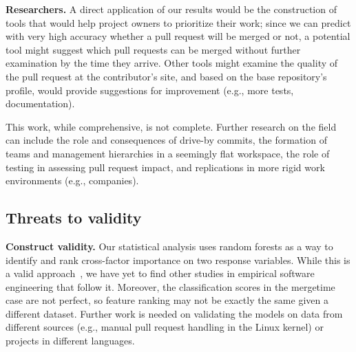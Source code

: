 \documentclass{acm_proc_article-sp}
\begin{document}

\textbf{Researchers.}
A direct application of our results would be the construction of tools that
would help project owners to prioritize their work; since we can predict
with very high accuracy whether a pull request will be merged or not, a
potential tool might suggest which pull requests can be merged without further
examination by the time they arrive. Other tools might examine the quality of
the pull request at the contributor's site, and based on the base repository's
profile, would provide suggestions for improvement (e.g., more tests,
documentation). 

This work, while comprehensive, is not complete. Further research
on the field can include the role and consequences of drive-by commits, 
the formation of teams and management hierarchies in a seemingly flat
workspace, the role of testing in assessing pull request impact,
and replications in more rigid work environments (e.g., companies).

\subsection{Threats to validity}

\textbf{Construct validity.} Our statistical analysis uses random forests as a way
to identify and rank cross-factor importance on two response variables. While
this is a valid approach~\cite{Genue10}, we have yet to find other studies in
empirical software engineering that follow it. Moreover, the classification
scores in the \textsf{mergetime} case are not perfect, so feature ranking may
not be exactly the same given a different dataset. Further work is needed on
validating the models on data from different sources (e.g., manual pull
request handling in the Linux kernel) or projects in different languages. 
\end{document}
